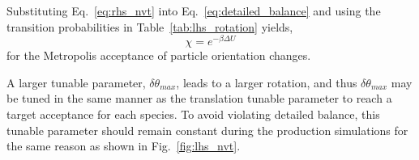 \documentclass[
  9pt,
  bestpractices,
]{livecoms}
\begin{document}
Substituting Eq.~\ref{eq:rhs_nvt} into Eq.~\ref{eq:detailed_balance} and using the transition probabilities in Table~\ref{tab:lhs_rotation} yields,
\begin{equation}
\chi = e^{-\beta\Delta U}
\label{eq:lhs_rotate}
\end{equation}
for the Metropolis acceptance of particle orientation changes.
%

A larger tunable parameter, $\delta\theta_{max}$, leads to a larger rotation, and thus $\delta\theta_{max}$ may be tuned in the same manner as the translation tunable parameter to reach a target acceptance for each species.
To avoid violating detailed balance, this tunable parameter should remain constant during the production simulations for the same reason as shown in Fig.~\ref{fig:lhs_nvt}.
\end{document}

